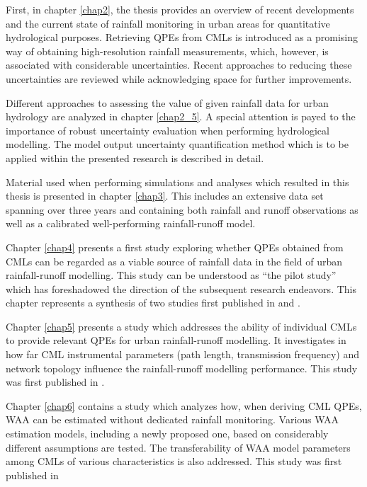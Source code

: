 \documentclass{ctuthesis}\usepackage[]{graphicx}\usepackage[]{color}
\begin{document}
First, in chapter \ref{chap2}, the thesis provides an overview of recent developments and the current state of rainfall monitoring in urban areas for quantitative hydrological purposes. Retrieving QPEs from CMLs is introduced as a promising way of obtaining high-resolution rainfall measurements, which, however, is associated with considerable uncertainties. Recent approaches to reducing these uncertainties are reviewed while acknowledging space for further improvements.

Different approaches to assessing the value of given rainfall data for urban hydrology are analyzed in chapter \ref{chap2_5}. A special attention is payed to the importance of robust uncertainty evaluation when performing hydrological modelling. The model output uncertainty quantification method which is to be applied within the presented research is described in detail. 

Material used when performing simulations and analyses which resulted in this thesis is presented in chapter \ref{chap3}. This includes an extensive data set spanning over three years and containing both rainfall and runoff observations as well as a calibrated well-performing rainfall-runoff model.

Chapter \ref{chap4} presents a first study exploring whether QPEs obtained from CMLs can be regarded as a viable source of rainfall data in the field of urban rainfall-runoff modelling. This study can be understood as \enquote{the pilot study} which has foreshadowed the direction of the subsequent research endeavors. This chapter represents a synthesis of two studies first published in \cite{pastorekReliabilityMicrowaveLink2017} and \cite{pastorekPosouzeniSrazkovychDat2018}.

Chapter \ref{chap5} presents a study which addresses the ability of individual CMLs to provide relevant QPEs for urban rainfall-runoff modelling. It investigates in how far CML instrumental parameters (path length, transmission frequency) and network topology influence the rainfall-runoff modelling performance. This study was first published in \cite{pastorekCommercialMicrowaveLinks2019}.

Chapter \ref{chap6} contains a study which analyzes how, when deriving CML QPEs, WAA can be estimated without dedicated rainfall monitoring. Various WAA estimation models, including a newly proposed one, based on considerably different assumptions are tested. The transferability of WAA model parameters among CMLs of various characteristics is also addressed. This study was first published in \cite{pastorekPrecipitationEstimatesCommercial2022}
\end{document}
